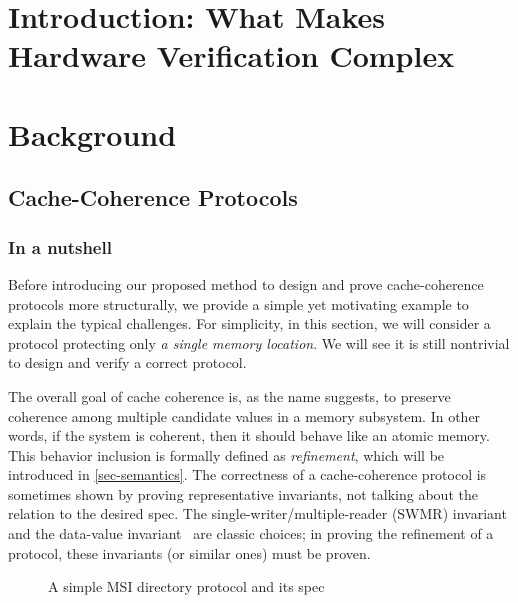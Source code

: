 \chapter{Introduction: What Makes Hardware Verification Complex}

\chapter{Background}

\section{Cache-Coherence Protocols}

\subsection{In a nutshell}
\label{sec-nutshell}

Before introducing our proposed method to design and prove cache-coherence protocols more structurally, we provide a simple yet motivating example to explain the typical challenges.
For simplicity, in this section, we will consider a protocol protecting only \emph{a single memory location}.
We will see it is still nontrivial to design and verify a correct protocol.

The overall goal of cache coherence is, as the name suggests, to preserve coherence among multiple candidate values in a memory subsystem.
In other words, if the system is coherent, then it should behave like an atomic memory.
This behavior inclusion is formally defined as \emph{refinement}, which will be introduced in \autoref{sec-semantics}.
The correctness of a cache-coherence protocol is sometimes shown by proving representative invariants, not talking about the relation to the desired spec.
The single-writer/multiple-reader (SWMR) invariant and the data-value invariant~\cite{ccbook:2020} are classic choices; in proving the refinement of a protocol, these invariants (or similar ones) must be proven.

\begin{figure}[t]
  \centering
  \caption{A simple MSI directory protocol and its spec}
  \label{fig-motive-1}
\end{figure}

